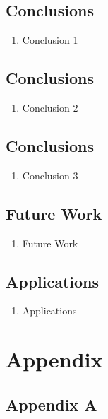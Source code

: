 \documentclass[oneside,a4paper,12pt]{book}
\begin{document}
\section{Conclusions}
\begin{enumerate}
    \item Conclusion 1
\end{enumerate}

\section{Conclusions}
\begin{enumerate}
    \item Conclusion 2
\end{enumerate} 

\section{Conclusions}
\begin{enumerate}
    \item Conclusion 3
\end{enumerate}

\section{Future Work}
\begin{enumerate}
    \item Future Work
\end{enumerate}

\section{Applications}
\begin{enumerate}
    \item Applications
\end{enumerate}
    

\chapter{Appendix}

\section{Appendix A}

\end{document}
